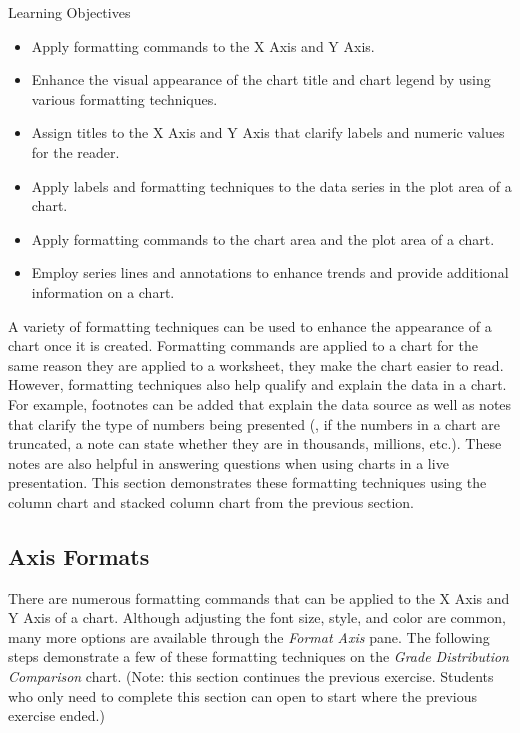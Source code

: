 \begin{center}
	\begin{objbox}{Learning Objectives}
		\begin{itemize}
			\setlength{\itemsep}{0pt}
			\setlength{\parskip}{0pt}
			\setlength{\parsep}{0pt}

			\item Apply formatting commands to the X Axis and Y Axis.
			\item Enhance the visual appearance of the chart title and chart legend by using various formatting techniques.
			\item Assign titles to the X Axis and Y Axis that clarify labels and numeric values for the reader.
			\item Apply labels and formatting techniques to the data series in the plot area of a chart.
			\item Apply formatting commands to the chart area and the plot area of a chart.
			\item Employ series lines and annotations to enhance trends and provide additional information on a chart.
			
		\end{itemize}
	\end{objbox}
\end{center}

A variety of formatting techniques can be used to enhance the appearance of a chart once it is created. Formatting commands are applied to a chart for the same reason they are applied to a worksheet, they make the chart easier to read. However, formatting techniques also help qualify and explain the data in a chart. For example, footnotes can be added that explain the data source as well as notes that clarify the type of numbers being presented (\ie, if the numbers in a chart are truncated, a note can state whether they are in thousands, millions, etc.). These notes are also helpful in answering questions when using charts in a live presentation. This section demonstrates these formatting techniques using the column chart and stacked column chart from the previous section.

\subsection{Axis Formats}

There are numerous formatting commands that can be applied to the X Axis and Y Axis of a chart. Although adjusting the font size, style, and color are common, many more options are available through the \textit{Format Axis} pane. The following steps demonstrate a few of these formatting techniques on the \textit{Grade Distribution Comparison} chart. (Note: this section continues the previous exercise. Students who only need to complete this section can open  to start where the previous exercise ended.)

